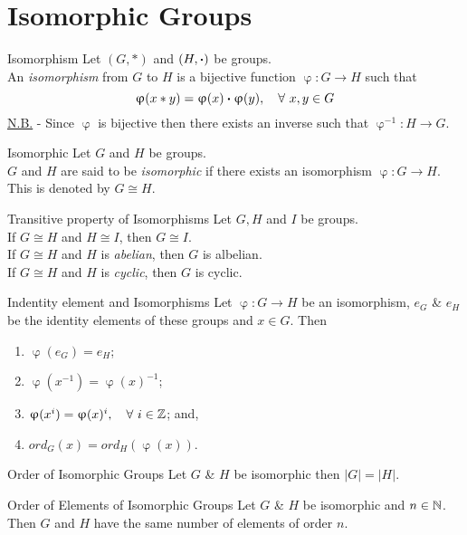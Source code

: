 \documentclass[11pt,a4paper]{article}
\begin{document}
\section{Isomorphic Groups}

\subtitle{Definition 9.01 - }{Isomorphism}
Let $(G, *)$ and $(H, \boldsymbol{\cdot})$ be groups.\\
An \textit{isomorphism} from $G$ to $H$ is a bijective function $\upvarphi : G \to H$ such that $$\upvarphi(x * y) = \upvarphi(x) \boldsymbol{\cdot} \upvarphi(y),\quad \forall\ x, y \in G$$
\underline{N.B.} - Since $\upvarphi$ is bijective then there exists an inverse such that $\upvarphi^{-1} : H \to G$.\\

\subtitle{Definition 9.02 - }{Isomorphic}
Let $G$ and $H$ be groups.\\
$G$ and $H$ are said to be \textit{isomorphic} if there exists an isomorphism $\upvarphi : G \to H$. This is denoted by $G \cong H$.\\

\subtitle{Proposition 9.03 - }{Transitive property of Isomorphisms}
Let $G, H$ and $I$ be groups.\\
If $G \cong H$  and $H \cong I$, then $G \cong I$.\\
If $G \cong H$ and $H$ is \textit{abelian}, then $G$ is albelian.\\
If $G \cong H$ and $H$ is \textit{cyclic}, then $G$ is cyclic.\\

\subtitle{Proposition 9.04 - }{Indentity element and Isomorphisms}
Let $\upvarphi : G \to H$ be an isomorphism, $e_G$ \& $e_H$ be the identity elements of these groups and $x \in G$. Then
\begin{enumerate}[label=\roman*)]
  \item $\upvarphi(e_G) = e_H$;
  \item $\upvarphi(x^{-1}) = \upvarphi(x)^{-1}$;
  \item $\upvarphi(x^i) = \upvarphi(x)^i,\quad \forall\ i \in \mathbb{Z}$; and,
  \item $ord_G(x) = ord_H(\upvarphi(x))$.\\
\end{enumerate}

\subtitle{Proposition 9.05 - }{Order of Isomorphic Groups}
Let $G$ \& $H$ be isomorphic then $|G| = |H|$.\\

\subtitle{Proposition 9.06 - }{Order of Elements of Isomorphic Groups}
Let $G$ \& $H$ be isomorphic and $n \in \mathbb{N}$.\\
Then $G$ and $H$ have the same number of elements of order $n$.
\end{document}

